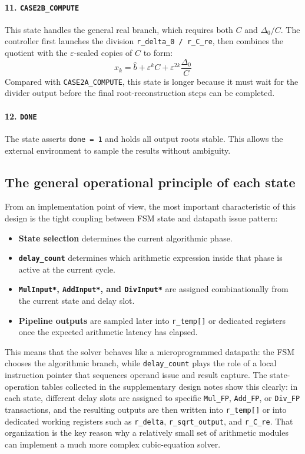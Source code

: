 \paragraph{11. \texttt{CASE2B\_COMPUTE}}
This state handles the general real branch, which requires both $C$ and $\Delta_0/C$. The controller first launches the division \texttt{r\_delta\_0 / r\_C\_re}, then combines the quotient with the $\varepsilon$-scaled copies of $C$ to form:
\begin{equation}
x_k = \hat{b} + \varepsilon^k C + \varepsilon^{2k}\frac{\Delta_0}{C}
\end{equation}
Compared with \texttt{CASE2A\_COMPUTE}, this state is longer because it must wait for the divider output before the final root-reconstruction steps can be completed.

\paragraph{12. \texttt{DONE}}
The state asserts \texttt{done = 1} and holds all output roots stable. This allows the external environment to sample the results without ambiguity.

\subsection{The general operational principle of each state}

From an implementation point of view, the most important characteristic of this design is the tight coupling between FSM state and datapath issue pattern:
\begin{itemize}
    \item \textbf{State selection} determines the current algorithmic phase.
    \item \textbf{\texttt{delay\_count}} determines which arithmetic expression inside that phase is active at the current cycle.
    \item \textbf{\texttt{MulInput*}, \texttt{AddInput*}, and \texttt{DivInput*}} are assigned combinationally from the current state and delay slot.
    \item \textbf{Pipeline outputs} are sampled later into \texttt{r\_temp[]} or dedicated registers once the expected arithmetic latency has elapsed.
\end{itemize}

This means that the solver behaves like a microprogrammed datapath: the FSM chooses the algorithmic branch, while \texttt{delay\_count} plays the role of a local instruction pointer that sequences operand issue and result capture. The state-operation tables collected in the supplementary design notes show this clearly: in each state, different delay slots are assigned to specific \texttt{Mul\_FP}, \texttt{Add\_FP}, or \texttt{Div\_FP} transactions, and the resulting outputs are then written into \texttt{r\_temp[]} or into dedicated working registers such as \texttt{r\_delta}, \texttt{r\_sqrt\_output}, and \texttt{r\_C\_re}. That organization is the key reason why a relatively small set of arithmetic modules can implement a much more complex cubic-equation solver.
